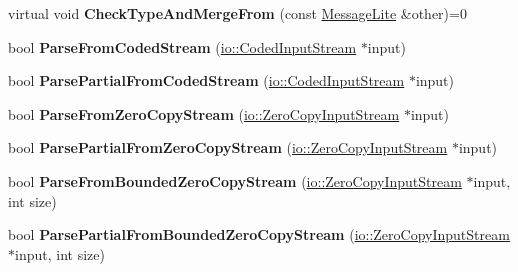 \begin{DoxyCompactItemize}
virtual void {\bfseries Check\+Type\+And\+Merge\+From} (const \hyperlink{classgoogle_1_1protobuf_1_1MessageLite}{Message\+Lite} \&other)=0
\item 
\mbox{\label{classgoogle_1_1protobuf_1_1MessageLite_a5875371d09bca5c4d75c793ad7be5bb6}} 
bool {\bfseries Parse\+From\+Coded\+Stream} (\hyperlink{classgoogle_1_1protobuf_1_1io_1_1CodedInputStream}{io\+::\+Coded\+Input\+Stream} $\ast$input)
\item 
\mbox{\label{classgoogle_1_1protobuf_1_1MessageLite_a5a2d379792185751116ffa1726e626bb}} 
bool {\bfseries Parse\+Partial\+From\+Coded\+Stream} (\hyperlink{classgoogle_1_1protobuf_1_1io_1_1CodedInputStream}{io\+::\+Coded\+Input\+Stream} $\ast$input)
\item 
\mbox{\label{classgoogle_1_1protobuf_1_1MessageLite_aac1193529df604ebb1a3100e39ae7f41}} 
bool {\bfseries Parse\+From\+Zero\+Copy\+Stream} (\hyperlink{classgoogle_1_1protobuf_1_1io_1_1ZeroCopyInputStream}{io\+::\+Zero\+Copy\+Input\+Stream} $\ast$input)
\item 
\mbox{\label{classgoogle_1_1protobuf_1_1MessageLite_ad73f03a053d00de0b4fb2fd7f22b5f3b}} 
bool {\bfseries Parse\+Partial\+From\+Zero\+Copy\+Stream} (\hyperlink{classgoogle_1_1protobuf_1_1io_1_1ZeroCopyInputStream}{io\+::\+Zero\+Copy\+Input\+Stream} $\ast$input)
\item 
\mbox{\label{classgoogle_1_1protobuf_1_1MessageLite_abf08f7031bab8fcf26814b8aebb2e3b5}} 
bool {\bfseries Parse\+From\+Bounded\+Zero\+Copy\+Stream} (\hyperlink{classgoogle_1_1protobuf_1_1io_1_1ZeroCopyInputStream}{io\+::\+Zero\+Copy\+Input\+Stream} $\ast$input, int size)
\item 
\mbox{\label{classgoogle_1_1protobuf_1_1MessageLite_a364e8a355fc09b042c5c58b1dd2f1631}} 
bool {\bfseries Parse\+Partial\+From\+Bounded\+Zero\+Copy\+Stream} (\hyperlink{classgoogle_1_1protobuf_1_1io_1_1ZeroCopyInputStream}{io\+::\+Zero\+Copy\+Input\+Stream} $\ast$input, int size)
\item 
\mbox{\label{classgoogle_1_1protobuf_1_1MessageLite_a52e87e23c34396217a8b07aca213f0a8}} 

\end{DoxyCompactItemize}
